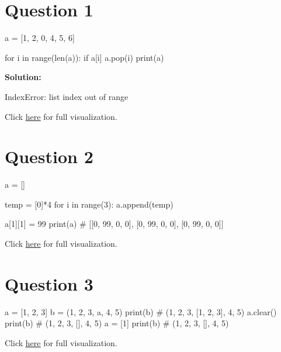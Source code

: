 \section{Question 1}
\begin{python}
a = [1, 2, 0, 4, 5, 6]

for i in range(len(a)):
    if a[i] %
        a.pop(i)
    print(a)
\end{python}
\textbf{Solution:}
\begin{python}
[1, 2, 0, 4, 5, 6]
[1, 0, 4, 5, 6]
[1, 0, 5, 6]
[1, 0, 5]
IndexError: list index out of range
\end{python}
Click \href{https://pythontutor.com/visualize.html#code=a%20%3D%20%5B1,%202,%200,%204,%205,%206%5D%0A%0Afor%20i%20in%20range%28len%28a%29%29%3A%0A%20%20%20%20if%20a%5Bi%5D%20%25%202%20%3D%3D%200%3A%0A%20%20%20%20%20%20%20%20a.pop%28i%29%0A%20%20%20%20print%28a%29&cumulative=false&curInstr=0&heapPrimitives=nevernest&mode=display&origin=opt-frontend.js&py=3&rawInputLstJSON=%5B%5D&textReferences=false}{\underline{here}} for full visualization.

\section{Question 2}
\begin{python}
a = []

temp = [0]*4
for i in range(3):
    a.append(temp)

a[1][1] = 99
print(a) # [[0, 99, 0, 0], [0, 99, 0, 0], [0, 99, 0, 0]]
\end{python}
Click \href{https://pythontutor.com/visualize.html#code=a%20%3D%20%5B%5D%0A%0Atemp%20%3D%20%5B0%5D*4%0Afor%20i%20in%20range%283%29%3A%0A%20%20%20%20a.append%28temp%29%0A%0Aa%5B1%5D%5B1%5D%20%3D%2099%0Aprint%28a%29&cumulative=false&curInstr=0&heapPrimitives=nevernest&mode=display&origin=opt-frontend.js&py=3&rawInputLstJSON=%5B%5D&textReferences=false}{\underline{here}} for full visualization.

\section{Question 3}
\begin{python}
a = [1, 2, 3]
b = (1, 2, 3, a, 4, 5)
print(b) # (1, 2, 3, [1, 2, 3], 4, 5)
a.clear()
print(b) # (1, 2, 3, [], 4, 5)
a = [1]
print(b) # (1, 2, 3, [], 4, 5)
\end{python}
Click \href{https://pythontutor.com/visualize.html#code=a%20%3D%20%5B1,%202,%203%5D%0Ab%20%3D%20%281,%202,%203,%20a,%204,%205%29%0Aprint%28b%29%0Aa.clear%28%29%0Aprint%28b%29%0Aa%20%3D%20%5B1%5D%0Aprint%28b%29&cumulative=false&curInstr=0&heapPrimitives=nevernest&mode=display&origin=opt-frontend.js&py=3&rawInputLstJSON=%5B%5D&textReferences=false}{\underline{here}} for full visualization.

